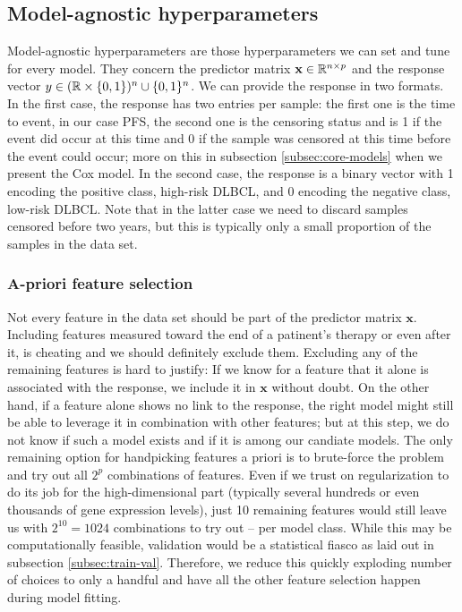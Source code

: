 \subsection{Model-agnostic hyperparameters}\label{subsec:model-agnostic}

Model-agnostic hyperparameters are those hyperparameters we can set and tune for every model. They 
concern the predictor matrix $\mathbf{x} \in \mathbb{R}^{n \times p}$ and the response vector $y \in 
(\mathbb{R} \times \{ 0, 1 \})^n \cup \{ 0, 1 \}^n$. We can provide the response in two formats. In the 
first case, the response has two entries per sample: the first one is the time to event, in our 
case PFS, the second one is the censoring status and is 1 if the event did occur at this time and 
0 if the sample was censored at this time before the event could occur; more on this in subsection 
\ref{subsec:core-models} when we present the Cox model. In the second case, the response is a binary 
vector with 1 encoding the positive class, high-risk DLBCL,
and 0 encoding the negative class, low-risk DLBCL. Note that in the latter case we need 
to discard samples censored before two years, but this is typically only a small proportion of the 
samples in the data set.

\subsubsection{A-priori feature selection}

Not every feature in the data set should be part of the predictor matrix $\mathbf{x}$. Including 
features measured toward the end of a patinent's therapy or even after it, is cheating and we 
should definitely exclude them. Excluding any of the remaining features is hard to justify: If we 
know for a feature that it alone is associated with the response, we include it in $\mathbf{x}$ 
without doubt.
On the other hand, if a feature alone shows no link to the response, the right model might still be 
able to leverage it in combination with other features; but at this step, we do not know if such 
a model exists and if it is among our candiate models. The only remaining option for handpicking 
features a priori is to brute-force the problem and try out all $2^p$ combinations of features.
Even if we trust on regularization to do its job for the high-dimensional part (typically several 
hundreds or even thousands of gene expression levels), just \num{10} remaining features would still
leave us with $2^{10} = 1024$ combinations to try out -- per model class. While this may be 
computationally feasible, validation would be a statistical fiasco as laid out in subsection 
\ref{subsec:train-val}. Therefore, we reduce this quickly exploding number of choices to only 
a handful and have all the other feature selection happen during model fitting. 

